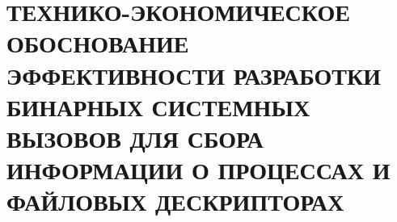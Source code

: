 \newcommand{\rub}{руб}
\section{ТЕХНИКО-ЭКОНОМИЧЕСКОЕ ОБОСНОВАНИЕ ЭФФЕКТИВНОСТИ РАЗРАБОТКИ БИНАРНЫХ
  СИСТЕМНЫХ ВЫЗОВОВ ДЛЯ СБОРА ИНФОРМАЦИИ О ПРОЦЕССАХ И ФАЙЛОВЫХ ДЕСКРИПТОРАХ}
















